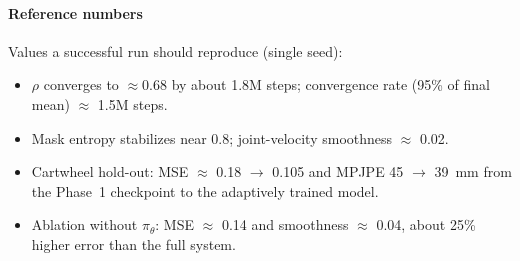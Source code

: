 \documentclass[10pt,letterpaper]{article}
\newcommand{\pth}{\pi_{\theta}}
\begin{document}
\paragraph{Reference numbers}
Values a successful run should reproduce (single seed):
\begin{itemize}
  \item $\rho$ converges to $\approx 0.68$ by about 1.8M steps; convergence rate (95\% of final mean) $\approx$ 1.5M steps.
  \item Mask entropy stabilizes near 0.8; joint-velocity smoothness $\approx$ 0.02.
  \item Cartwheel hold-out: MSE $\approx$ 0.18 $\rightarrow$ 0.105 and MPJPE 45 $\rightarrow$ 39~mm from the Phase~1 checkpoint to the adaptively trained model.
  \item Ablation without $\pth$: MSE $\approx$ 0.14 and smoothness $\approx$ 0.04, about 25\% higher error than the full system.
\end{itemize}
\end{document}
